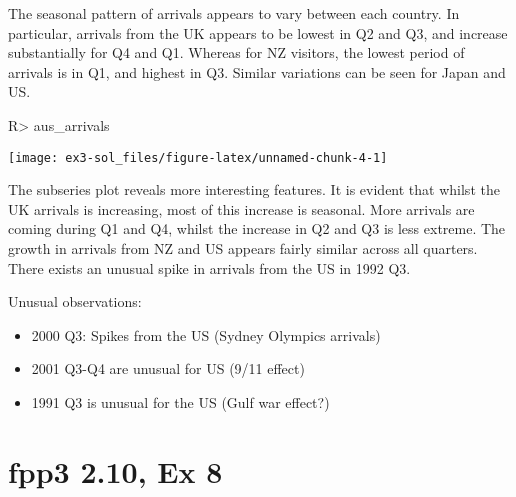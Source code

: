 \documentclass[
]{article}
\providecommand{\tightlist}{%
  \setlength{\itemsep}{0pt}\setlength{\parskip}{0pt}}
\begin{document}
The seasonal pattern of arrivals appears to vary between each country. In particular, arrivals from the UK appears to be lowest in Q2 and Q3, and increase substantially for Q4 and Q1. Whereas for NZ visitors, the lowest period of arrivals is in Q1, and highest in Q3. Similar variations can be seen for Japan and US.

\begin{CodeChunk}
\begin{CodeInput}
R> aus_arrivals %
\end{CodeInput}


\begin{center}\texttt{[image: ex3-sol\_files/figure-latex/unnamed-chunk-4-1]} \end{center}

\end{CodeChunk}

The subseries plot reveals more interesting features. It is evident that whilst the UK arrivals is increasing, most of this increase is seasonal. More arrivals are coming during Q1 and Q4, whilst the increase in Q2 and Q3 is less extreme. The growth in arrivals from NZ and US appears fairly similar across all quarters. There exists an unusual spike in arrivals from the US in 1992 Q3.

Unusual observations:

\begin{itemize}
\tightlist
\item
  2000 Q3: Spikes from the US (Sydney Olympics arrivals)
\item
  2001 Q3-Q4 are unusual for US (9/11 effect)
\item
  1991 Q3 is unusual for the US (Gulf war effect?)
\end{itemize}

\hypertarget{fpp3-2.10-ex-8}{%
\section{fpp3 2.10, Ex 8}\label{fpp3-2.10-ex-8}}
\end{document}
